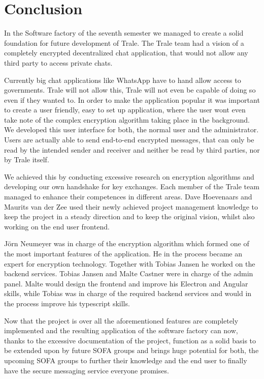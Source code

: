 \chapter{Conclusion}\label{ch:conclusion}
In the Software factory of the seventh semester we managed to create a solid foundation for future development of Trale.
The Trale team had a vision of a completely encrypted decentralized chat application, that would not allow any third
party to access private chats.

Currently big chat applications like WhatsApp have to hand allow access to governments.
Trale will not allow this, Trale will not even be capable of doing so even if they wanted to.
In order to make the application popular it was important to create a user friendly, easy to set up application, where
the user wont even take note of the complex encryption algorithm taking place in the background.
We developed this user interface for both, the normal user and the administrator.
Users are actually able to send end-to-end encrypted messages, that can only be read by the intended sender and receiver
and neither be read by third parties, nor by Trale itself.

We achieved this by conducting excessive research on encryption algorithms and developing our own handshake for key
exchanges.
Each member of the Trale team managed to enhance their competences in different areas.
Dave Hoevenaars and Maurits van der Zee used their newly achieved project management knowledge to keep the project in
a steady direction and to keep the original vision, whilst also working on the end user frontend.

J\"orn Neumeyer was in charge of the encryption algorithm which formed one of the most important features of the
application.
He in the process became an expert for encryption technology.
Together with Tobias Jansen he worked on the backend services.
Tobias Jansen and Malte Castner were in charge of the admin panel.
Malte would design the frontend and improve his Electron and Angular skills, while Tobias was in charge of the required
backend services and would in the process improve his typescript skills.

Now that the project is over all the aforementioned features are completely implemented and the resulting application
of the software factory can now, thanks to the excessive documentation of the project, function as a solid basis to be
extended upon by future SOFA groups and brings huge potential for both, the upcoming SOFA groups to further their
knowledge and the end user to finally have the secure messaging service everyone promises.
